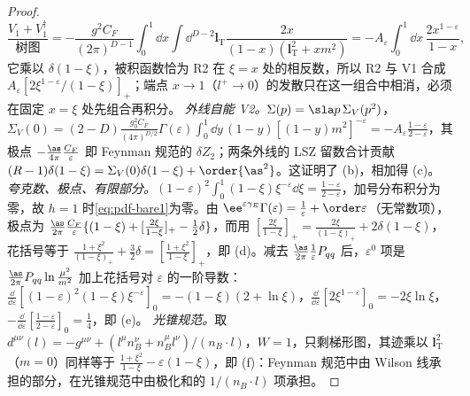 \begin{proof}
\[
\frac{V_1+V_1^\dagger}{\text{树图}}=-\frac{g^2C_F}{(2\pi)^{D-1}}\int_0^1\!\dd x\!\int\!\dd^{D-2}\bm l_{\mathrm T}\frac{2x}{(1-x)(\bm l_{\mathrm T}^2+xm^2)}=-A_\varepsilon\int_0^1\!\dd x\,\frac{2x^{1-\varepsilon}}{1-x},
\]
它乘以 $\delta(1-\xi)$，被积函数恰为 R2 在 $\xi=x$ 处的相反数，所以 R2 与 V1 合成 $A_\varepsilon[2\xi^{1-\varepsilon}/(1-\xi)]_+$；端点 $x\to1$（$l^+\to0$）的发散只在这一组合中相消，必须在固定 $x=\xi$ 处先组合再积分。
\emph{外线自能 V2。}$\Sigma(p)=\sla p\,\Sigma_V(p^2)$，$\Sigma_V(0)=(2-D)\frac{g_0^2C_F}{(4\pi)^{D/2}}\Gamma(\varepsilon)\int_0^1\dd y\,(1-y)[(1-y)m^2]^{-\varepsilon}=-A_\varepsilon\frac{1-\varepsilon}{2-\varepsilon}$，其极点 $-\frac{\as}{4\pi}\frac{C_F}\varepsilon$ 即 Feynman 规范的 $\delta Z_2$；两条外线的 LSZ 留数合计贡献 $(R-1)\delta(1-\xi)=\Sigma_V(0)\delta(1-\xi)+\order{\as^2}$。这证明了 (b)，相加得 (c)。
\emph{夸克数、极点、有限部分。}$(1-\varepsilon)^2\int_0^1(1-\xi)\xi^{-\varepsilon}\dd\xi=\frac{1-\varepsilon}{2-\varepsilon}$，加号分布积分为零，故 $h=1$ 时\cref{eq:pdf-bare1}为零。由 $\ee^{\varepsilon\gamma_E}\Gamma(\varepsilon)=\frac1\varepsilon+\order\varepsilon$（无常数项），极点为 $\frac{\as}{2\pi}\frac{C_F}\varepsilon\{(1-\xi)+[\frac{2\xi}{1-\xi}]_+-\frac12\delta\}$，而用 $[\frac{2\xi}{1-\xi}]_+=\frac{2\xi}{(1-\xi)_+}+2\delta(1-\xi)$，花括号等于 $\frac{1+\xi^2}{(1-\xi)_+}+\frac32\delta=[\frac{1+\xi^2}{1-\xi}]_+$，即 (d)。减去 $\frac{\as}{2\pi}\frac1\varepsilon P_{qq}$ 后，$\varepsilon^0$ 项是 $\frac{\as}{2\pi}P_{qq}\ln\frac{\mu^2}{m^2}$ 加上花括号对 $\varepsilon$ 的一阶导数：$\frac{\dd}{\dd\varepsilon}[(1-\varepsilon)^2(1-\xi)\xi^{-\varepsilon}]_0=-(1-\xi)(2+\ln\xi)$，$\frac{\dd}{\dd\varepsilon}[2\xi^{1-\varepsilon}]_0=-2\xi\ln\xi$，$-\frac{\dd}{\dd\varepsilon}[\frac{1-\varepsilon}{2-\varepsilon}]_0=\frac14$，即 (e)。
\emph{光锥规范。}取 $d^{\mu\nu}(l)=-g^{\mu\nu}+(l^\mu n_B^\nu+n_B^\mu l^\nu)/(n_B\cdot l)$，$W=1$，只剩梯形图，其迹乘以 $\bm l_{\mathrm T}^2$（$m=0$）同样等于 $\frac{1+\xi^2}{1-\xi}-\varepsilon(1-\xi)$，即 (f)：Feynman 规范中由 Wilson 线承担的部分，在光锥规范中由极化和的 $1/(n_B\cdot l)$ 项承担。
\end{proof}

